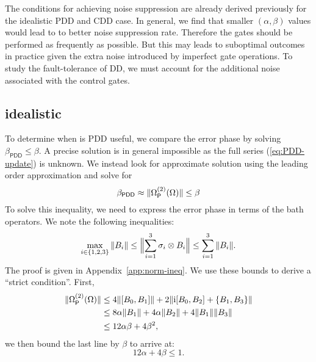 \documentclass[aps,pra,reprint,superscriptaddress]{revtex4-2}
\newcommand{\Opdd}{\Omega_{\mathsf{P}}}
\begin{document}
The conditions for achieving noise suppression are already derived previously for the idealistic PDD and CDD case.
In general, we find that smaller $(\alpha,\beta)$ values would lead to to better noise suppression rate. Therefore the gates should be performed as frequently as possible. But this may leads to suboptimal outcomes in practice given the extra noise introduced by imperfect gate operations. To study the fault-tolerance of DD, we must account for the additional noise associated with the control gates.


\subsection{idealistic}

To determine when is PDD useful, we compare the error phase by solving $\beta_\mathsf{PDD}\le\beta$.
A precise solution is in general impossible as the full series (\ref{eq:PDD-update}) is unknown. We instead look for approximate solution using the leading order approximation and solve for 
\begin{equation}
    \beta_\mathsf{PDD}\approx \norm{\Opdd\up{2}(\Omega)}\le \beta
\end{equation}
To solve this inequality, we need 
to express the error phase in terms
of the bath operators.  We note the following inequalities:
\begin{align}\label{eq:errph-strict}
    \max_{i\in\{1,2,3\}} \norm{B_i}\le \norm[\Big]{\sum_{i=1}^3 \sigma_i \otimes B_i} \le \sum_{i=1}^3 \norm{B_i}.
\end{align}
The proof is given in Appendix~\ref{app:norm-ineq}. We use these bounds to derive a ``strict condition''. First, 
\begin{align}
\norm{\Opdd\up{2}(\Omega)} &\le
4\norm{[B_0,B_1]} +2\norm{\upi [B_0,B_2] +\{B_1,B_3\}} \notag \\
&\le 8 \alpha \norm{B_1} + 4 \alpha \norm{B_2} + 4\norm{B_1}\norm{B_3} \notag\\
&\le 12\alpha\beta +4\beta^2,
\end{align}
we then bound the last line by $\beta$ to arrive at: 
\begin{equation}\label{eq:pdd-region-strict}
    12\alpha + 4\beta \le 1.
\end{equation}
\end{document}
